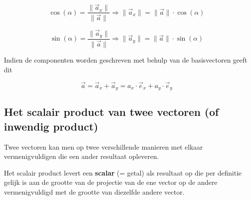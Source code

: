 \documentclass{ximera}
\begin{document}
\[
\cos(\alpha) = \frac{\| \vec{a}_x \|}{\| \vec{a} \|} \Rightarrow \| \vec{a}_x \| = \|\vec{a}\| \cdot \cos(\alpha)
\]

\[
\sin(\alpha) = \frac{\| \vec{a}_y \|}{\| \vec{a} \|} \Rightarrow \| \vec{a}_y \| = \|\vec{a}\| \cdot \sin(\alpha)
\]

\begin{image}[!]
\end{image}

Indien de componenten worden geschreven met behulp van de basisvectoren geeft dit 


$$
\vec{a} = \vec{a}_x + \vec{a}_y = a_x \cdot \vec{e}_x + a_y \cdot \vec{e}_y 
$$


\subsection*{Het scalair product van twee vectoren (of inwendig product)}

Twee vectoren kan men op twee verschillende manieren met elkaar vermenigvuldigen die een ander resultaat opleveren. 

Het scalair product levert een \textbf{scalar} (= getal) als resultaat op die per definitie gelijk is aan de grootte van de projectie van de ene vector op de andere vermenigvuldigd met de grootte van diezelfde andere vector. 
\end{document}
